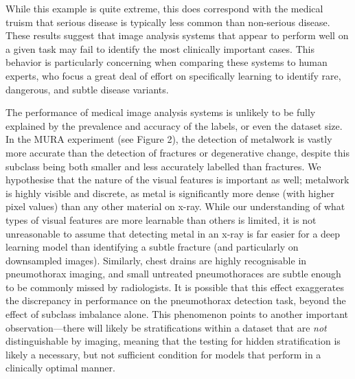 \documentclass{article}
\begin{document}
While this example is quite extreme, this does correspond with the medical truism that serious disease is typically less common than non-serious disease. 
These results suggest that image analysis systems that appear to perform well on a given task may fail to identify the most clinically important cases. 
This behavior is particularly concerning when comparing these systems to human experts, who focus a great deal of effort on specifically learning to identify rare, dangerous, and subtle disease variants.

The performance of medical image analysis systems is unlikely to be fully explained by the prevalence and accuracy of the labels, or even the dataset size. 
In the MURA experiment (see Figure 2), the detection of metalwork is vastly more accurate than the detection of fractures or degenerative change, despite this subclass being both smaller and less accurately labelled than fractures. 
We hypothesise that the nature of the visual features is important as well; metalwork is highly visible and discrete, as metal is significantly more dense (with higher pixel values) than any other material on x-ray. 
While our understanding of what types of visual features are more learnable than others is limited, it is not unreasonable to assume that detecting metal in an x-ray is far easier for a deep learning model than identifying a subtle fracture (and particularly on downsampled images).
Similarly, chest drains are highly recognisable in pneumothorax imaging, and small untreated pneumothoraces are subtle enough to be commonly missed by radiologists. 
It is possible that this effect exaggerates the discrepancy in performance on the pneumothorax detection task, beyond the effect of subclass imbalance alone.
This phenomenon points to another important observation---there will likely be stratifications within a dataset that are \textit{not} distinguishable by imaging, meaning that the testing for hidden stratification is likely a necessary, but not sufficient condition for models that perform in a clinically optimal manner.
\end{document}
